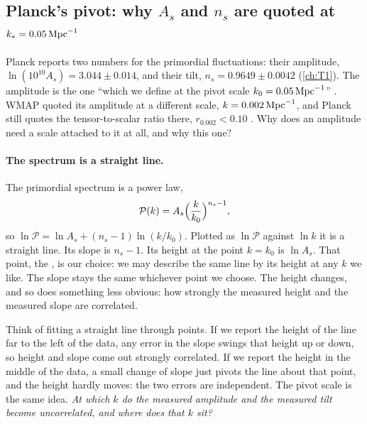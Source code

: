 \subsection{Planck's pivot: why \texorpdfstring{$A_s$ and $n_s$ are quoted at $k_*=0.05\,{\rm Mpc}^{-1}$}{A\_s and n\_s are quoted at k = 0.05/Mpc}}
\label{8a:sec:lit-pivot}

Planck reports two numbers for the primordial fluctuations: their amplitude,
$\ln(10^{10}A_s)=3.044\pm0.014$, and their tilt, $n_s=0.9649\pm0.0042$ (\cref{ch:T1}). The amplitude
is the one ``which we define at the pivot scale $k_0=0.05\,{\rm Mpc}^{-1}$'' \cite{Planck2018VI}.
WMAP quoted its amplitude at a different scale, $k=0.002\,{\rm Mpc}^{-1}$, and Planck still quotes
the tensor-to-scalar ratio there, $r_{0.002}<0.10$ \cite{Planck2018VI}. Why does an amplitude need
a scale attached to it at all, and why this one?

\paragraph{The spectrum is a straight line.}
The primordial spectrum is a power law,
\begin{equation}
  \mathcal P(k)=A_s\Bigl(\frac{k}{k_0}\Bigr)^{n_s-1},
  \label{8a:eq:pivot-pk}
\end{equation}
so $\ln\mathcal P=\ln A_s+(n_s-1)\ln(k/k_0)$. Plotted as $\ln\mathcal P$ against $\ln k$ it is a
straight line. Its slope is $n_s-1$. Its height at the point $k=k_0$ is $\ln A_s$. That point,
the , is our choice: we may describe the same line by its height at any $k$ we
like. The slope stays the same whichever point we choose. The height changes, and so does
something less obvious: how strongly the measured height and the measured slope are correlated.

Think of fitting a straight line through points. If we report the height of the line far to the
left of the data, any error in the slope swings that height up or down, so height and slope come
out strongly correlated. If we report the height in the middle of the data, a small change of
slope just pivots the line about that point, and the height hardly moves: the two errors are
independent. The pivot scale is the same idea. \emph{At which $k$ do the
measured amplitude and the measured tilt become uncorrelated, and where does that $k$ sit?}

